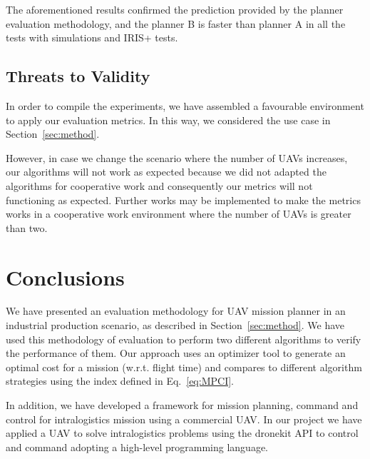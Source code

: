 \documentclass[conference,harvard,brazil,english]{sbatex}
\begin{document}
	The aforementioned results confirmed the prediction provided by the planner evaluation methodology, and the planner B is faster than planner A in all the tests with simulations and IRIS+ tests.
	
\subsection{Threats to Validity}
\label{sec:ameacas}

In order to compile the experiments, we have assembled a favourable environment to apply our evaluation metrics. In this way, we considered the use case in Section~\ref{sec:method}.

However, in case we change the scenario where the number of UAVs increases, our algorithms will not work as expected because we did not adapted the algorithms for cooperative work and consequently our metrics will not functioning as expected. Further works may be implemented to make the metrics works in a cooperative work environment where the number of UAVs is greater than two.


\section{Conclusions}
\label{sec:conclusao}

We have presented an evaluation methodology for UAV mission planner in an industrial production scenario, as described in Section~\ref{sec:method}. We have used this methodology of evaluation to perform two different algorithms to verify the performance of them. Our approach uses an optimizer tool to generate an optimal cost for a mission (w.r.t. flight time) and compares to different algorithm strategies using the index defined in Eq.~\ref{eq:MPCI}.
 
In addition, we have developed a framework for mission planning, command and control for intralogistics mission using a commercial UAV. In our project we have applied a UAV to solve intralogistics problems using the dronekit API to control and command adopting a high-level programming language.
\end{document}
